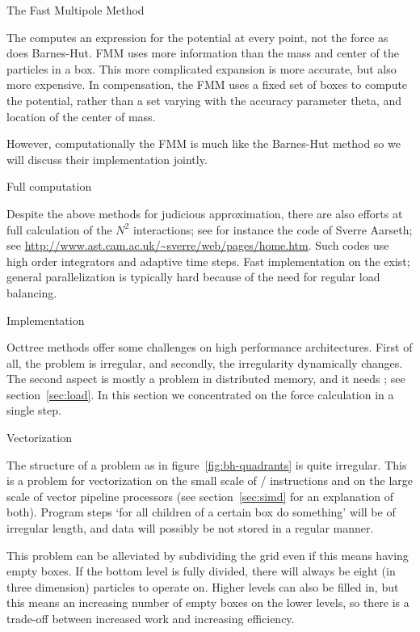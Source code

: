 
 {The Fast Multipole Method}

The  computes an expression for the potential at every point,
not the force as does Barnes-Hut.  \ac{FMM} uses more information than the
mass and center of the particles in a box. This more complicated
expansion is more accurate, but also more expensive. In compensation,
the FMM uses a fixed set of boxes to compute the potential, rather
than a set varying with the accuracy parameter theta, and location of
the center of mass.

However, computationally the \ac{FMM} is much like the Barnes-Hut
method so we will discuss their implementation jointly.

 {Full computation}

Despite the above methods for judicious approximation, there are also
efforts at full calculation of the $N^2$ interactions; see for
instance the  code of Sverre Aarseth;
see \url{http://www.ast.cam.ac.uk/~sverre/web/pages/home.htm}.
Such codes use high order integrators and adaptive time steps.
Fast implementation on the  exist;
general parallelization is typically hard because of the need
for regular load balancing.

 {Implementation}

Octtree methods offer some challenges on high performance
architectures. First of all, the problem is irregular, and secondly,
the irregularity dynamically changes. The second aspect is mostly a
problem in distributed memory, and it
needs ; see section~\ref{sec:load}. In
this section we concentrated on the force calculation in a single
step.

 {Vectorization}

The structure of a problem as in figure~\ref{fig:bh-quadrants} is
quite irregular. This is a problem for vectorization on the small
scale of / instructions and on the large
scale of vector pipeline processors (see section~\ref{sec:simd} for an
explanation of both). Program steps `for all children of a certain box
do something' will be of irregular length, and data will possibly be
not stored in a regular manner.

This problem can be alleviated by subdividing the grid even if this
means having empty boxes. If the bottom level is fully divided, there
will always be eight (in three dimension) particles to operate
on. Higher levels can also be filled in, but this means an increasing
number of empty boxes on the lower levels, so there is a trade-off
between increased work and increasing efficiency.

